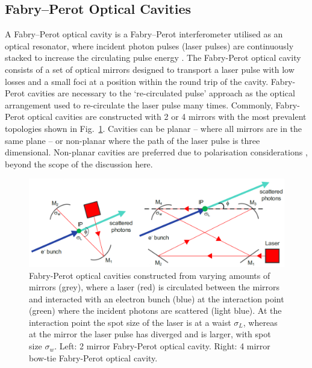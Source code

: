 \documentclass[../main.tex]{subfiles}
\begin{document}
\subsection{Fabry--Perot Optical Cavities}
\label{sec:fabry_perot_optical_cavities}

A Fabry--Perot optical cavity is a Fabry--Perot interferometer \cite{fabry1901new} utilised as an optical resonator, where incident photon pulses (laser pulses) are continuously stacked to increase the circulating pulse energy \cite{schawlow1958infrared,variola2011luminosity}.
The Fabry-Perot optical cavity consists of a set of optical mirrors designed to transport a laser pulse with low losses and a small foci at a position within the round trip of the cavity. Fabry-Perot cavities are necessary to the `re-circulated pulse' approach as the optical arrangement used to re-circulate the laser pulse many times. Commonly, Fabry-Perot optical cavities are constructed with 2 or 4 mirrors with the most prevalent topologies shown in Fig.~\ref{fig:2_mirror_4_mirror}. Cavities can be planar -- where all mirrors are in the same plane -- or non-planar where the path of the laser pulse is three dimensional. Non-planar cavities are preferred due to polarisation considerations \cite{zomer2009polarization}, beyond the scope of the discussion here.
\begin{figure}[!h]
\centering
\includegraphics[width=\textwidth]{Figures/Photon_Production_by_Inverse_Compton_Scattering/2_mirror_4_mirror.pdf}
\caption{Fabry-Perot optical cavities constructed from varying amounts of mirrors (grey), where a laser (red) is circulated between the mirrors and interacted with an electron bunch (blue) at the interaction point (green) where the incident photons are scattered (light blue). At the interaction point the spot size of the laser is at a waist $\sigma_{L}$, whereas at the mirror the laser pulse has diverged and is larger, with spot size $\sigma_{w}$. Left: 2 mirror Fabry-Perot optical cavity. Right: 4 mirror bow-tie Fabry-Perot optical cavity.}
\label{fig:2_mirror_4_mirror}
\end{figure}
\end{document}
